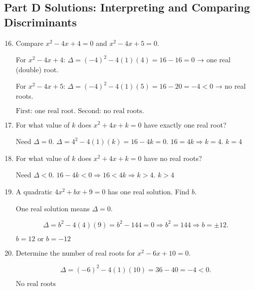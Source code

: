 \documentclass[12pt]{article}
\begin{document}
\subsection*{Part D Solutions: Interpreting and Comparing Discriminants}
\begin{enumerate}
  \setcounter{enumi}{15}
  \item Compare \(x^2 - 4x + 4 = 0\) and \(x^2 - 4x + 5 = 0.\)

  For \(x^2 - 4x + 4\):  
  \(\Delta = (-4)^2 - 4(1)(4) = 16 - 16 = 0\) → one real (double) root.

  For \(x^2 - 4x + 5\):  
  \(\Delta = (-4)^2 - 4(1)(5) = 16 - 20 = -4 < 0\) → no real roots.

  \(\boxed{\text{First: one real root. Second: no real roots.}}\)

  \item For what value of \(k\) does \(x^2 + 4x + k = 0\) have exactly one real root?

  Need \(\Delta = 0.\)  
  \(\Delta = 4^2 - 4(1)(k) = 16 - 4k = 0.\)  
  \(16 = 4k \Rightarrow k = 4.\)  
  \(\boxed{k = 4}\)

  \item For what value of \(k\) does \(x^2 + 4x + k = 0\) have no real roots?

  Need \(\Delta < 0.\)  
  \(16 - 4k < 0 \Rightarrow 16 < 4k \Rightarrow k > 4.\)  
  \(\boxed{k > 4}\)

  \item A quadratic \(4x^2 + bx + 9 = 0\) has one real solution. Find \(b.\)

  One real solution means \(\Delta = 0.\)

  \[
  \Delta = b^2 - 4(4)(9) = b^2 - 144 = 0
  \Rightarrow b^2 = 144
  \Rightarrow b = \pm 12.
  \]

  \(\boxed{b = 12 \text{ or } b = -12}\)

  \item Determine the number of real roots for \(x^2 - 6x + 10 = 0.\)

  \[
  \Delta = (-6)^2 - 4(1)(10) = 36 - 40 = -4 < 0.
  \]

  \(\boxed{\text{No real roots}}\)
\end{enumerate}
\end{document}

